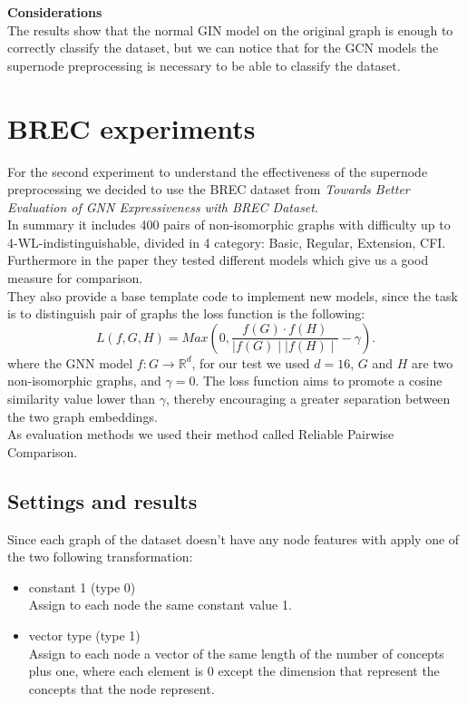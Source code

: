 \documentclass[twoside,11pt]{article}
\begin{document}
\noindent
\textbf{Considerations}\\
The results show that the normal GIN model on the original graph is enough to correctly classify the dataset, but we can notice that for the GCN models the supernode preprocessing is necessary to be able to classify the dataset.




\section{BREC experiments} %
\label{sec:brec_experiments}
For the second experiment to understand the effectiveness of the supernode preprocessing we decided to use the BREC dataset from \textit{Towards Better Evaluation of GNN Expressiveness with BREC Dataset}.\\
In summary it includes 400 pairs of non-isomorphic graphs with difficulty up to 4-WL-indistinguishable, divided in 4 category: Basic, Regular, Extension, CFI. Furthermore in the paper they tested different models which give us a good measure for comparison. \\
They also provide a base template code to implement new models, since the task is to distinguish pair of graphs the loss function is the following:\[
    L(f, G, H) = Max(0, \frac{f(G) \cdot f(H)}{\mid f(G) \mid \mid f(H) \mid} - \gamma)
.\] where the GNN model \( f : {G} \to \mathbb{R}^d \), for our test we used \( d=16 \), \( G \) and \( H \) are two non-isomorphic graphs, and \( \gamma = 0 \). The loss function aims to promote a cosine similarity
value lower than \( \gamma \), thereby encouraging a greater separation between the two graph embeddings.\\
As evaluation methods we used their method called Reliable Pairwise Comparison.

\subsection{Settings and results} %
\label{sub:settings_and_results}

Since each graph of the dataset doesn't have any node features with apply one of the two following transformation:
\begin{itemize}
    \item constant 1 (type 0)\\
        Assign to each node the same constant value 1.
    \item vector type (type 1)\\
        Assign to each node a vector of the same length of the number of concepts plus one, where each element is 0 except the dimension that represent the concepts that the node represent.
\end{itemize}
\end{document}
